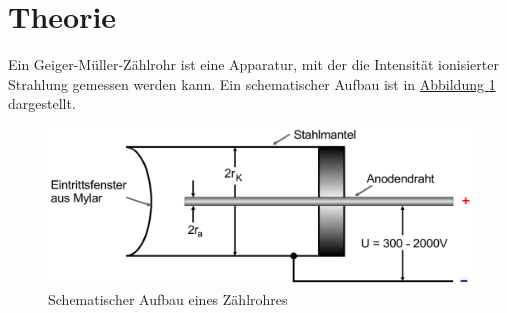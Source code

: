 \section{Theorie}
\label{sec:Theorie}

Ein Geiger-Müller-Zählrohr ist eine Apparatur, mit der die Intensität ionisierter Strahlung gemessen werden kann.
Ein schematischer Aufbau ist in \hyperref[fig:Aufbau1]{Abbildung \ref{fig:Aufbau1}} dargestellt.
\begin{figure} [H]
    \center
    \caption{Schematischer Aufbau eines Zählrohres}\label{fig:Aufbau1}
    \includegraphics[width=0.7\linewidth]{pictures/Aufbau1.pdf}
\end{figure}
